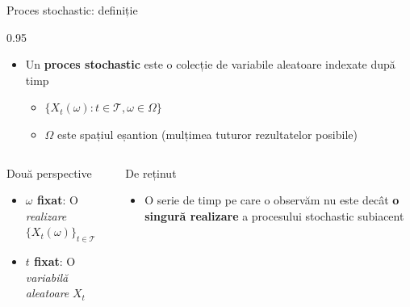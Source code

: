 \documentclass[9pt, aspectratio=169, t]{beamer}
\begin{document}
\begin{frame}{Proces stochastic: definiție}
    \begin{cminipage}{0.95\textwidth}
        \begin{defn}
            \begin{itemize}\setlength{\itemsep}{0pt}
                \item Un \textbf{proces stochastic} este o colecție de variabile aleatoare indexate după timp
                \begin{itemize}
                    \item $\{X_t(\omega) : t \in \mathcal{T}, \omega \in \Omega\}$
                    \item $\Omega$ este spațiul eșantion (mulțimea tuturor rezultatelor posibile)
                \end{itemize}
            \end{itemize}
        \end{defn}

        \vspace{0.1cm}

        \begin{columns}[T]
            \begin{block}{Două perspective}
                \begin{itemize}\setlength{\itemsep}{0pt}
                    \item \textbf{$\omega$ fixat}: O \textit{realizare} $\{X_t(\omega)\}_{t \in \mathcal{T}}$
                    \item \textbf{$t$ fixat}: O \textit{variabilă aleatoare} $X_t$
                \end{itemize}
            \end{block}
            \begin{block}{De reținut}
                \begin{itemize}\setlength{\itemsep}{0pt}
                    \item O serie de timp pe care o observăm nu este decât \textbf{o singură realizare} a procesului stochastic subiacent
                \end{itemize}
            \end{block}
        \end{columns}
    \end{cminipage}
\end{frame}
\end{document}
